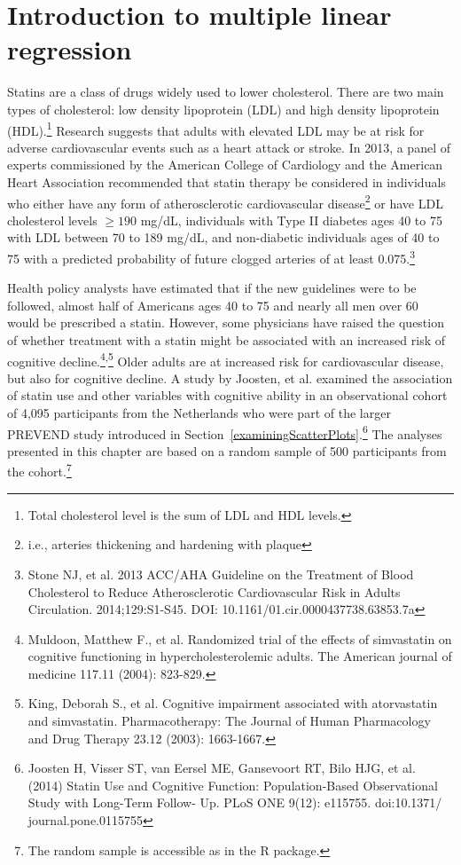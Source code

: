 \section{Introduction to multiple linear regression}
\label{introductionMultipleLinearRegression}

Statins are a class of drugs widely used to lower cholesterol. There are two main types of cholesterol: low density lipoprotein (LDL) and high density lipoprotein (HDL).\footnote{Total cholesterol level is the sum of LDL and HDL levels.} Research suggests that adults with elevated LDL may be at risk for adverse cardiovascular events such as a heart attack or stroke. In 2013, a panel of experts commissioned by the American College of Cardiology and the American Heart Association recommended that statin therapy be considered in individuals who either have any form of atherosclerotic cardiovascular disease\footnote{i.e., arteries thickening and hardening with plaque} or have LDL cholesterol levels $\geq 190$ mg/dL, individuals with Type II diabetes ages 40 to 75 with LDL between 70 to 189 mg/dL, and non-diabetic individuals ages of 40 to 75 with a predicted probability of future clogged arteries of at least 0.075.\footnote{Stone NJ, et al. 2013 ACC/AHA Guideline on the Treatment of Blood Cholesterol to Reduce Atherosclerotic Cardiovascular Risk in Adults Circulation. 2014;129:S1-S45. DOI: 10.1161/01.cir.0000437738.63853.7a}



Health policy analysts have estimated that if the new guidelines were to be 
followed, almost half of Americans ages 40 to 75 and nearly all men over 60 would be prescribed a statin. However, some physicians have raised the question of whether treatment with a statin might be associated with an increased risk of cognitive decline.\footnote{Muldoon, Matthew F., et al. Randomized trial of the effects of simvastatin on cognitive functioning in hypercholesterolemic adults. The American journal of medicine 117.11 (2004): 823-829.}\textsuperscript{,}\footnote{King, Deborah S., et al. Cognitive impairment associated with atorvastatin and simvastatin. Pharmacotherapy: The Journal of Human Pharmacology and Drug Therapy 23.12 (2003): 1663-1667.} Older adults are at increased risk for cardiovascular disease, but also for cognitive decline. A study by Joosten, et al. examined the association of statin use and other variables with cognitive ability in an observational cohort of 4,095 participants from the Netherlands who were part of the larger PREVEND study introduced in Section~\ref{examiningScatterPlots}.\footnote{Joosten H, Visser ST, van Eersel ME, Gansevoort RT, Bilo HJG, et al. (2014) Statin Use and Cognitive Function: Population-Based Observational Study with Long-Term Follow- Up. PLoS ONE 9(12): e115755. doi:10.1371/ journal.pone.0115755} The analyses presented in this chapter are based on a random sample of 500 participants from the cohort.\footnote{The random sample is accessible as  in the  \textsf{R} package.}

